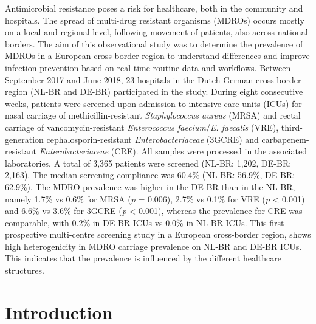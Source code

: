 \documentclass[
]{book}
\begin{document}
Antimicrobial resistance poses a risk for healthcare, both in the community and hospitals. The spread of multi-drug resistant organisms (MDROs) occurs mostly on a local and regional level, following movement of patients, also across national borders. The aim of this observational study was to determine the prevalence of MDROs in a European cross-border region to understand differences and improve infection prevention based on real-time routine data and workflows. Between September 2017 and June 2018, 23 hospitals in the Dutch-German cross-border region (NL-BR and DE-BR) participated in the study. During eight consecutive weeks, patients were screened upon admission to intensive care units (ICUs) for nasal carriage of methicillin-resistant \emph{Staphylococcus aureus} (MRSA) and rectal carriage of vancomycin-resistant \emph{Enterococcus faecium}/\emph{E. faecalis} (VRE), third-generation cephalosporin-resistant \emph{Enterobacteriaceae} (3GCRE) and carbapenem-resistant \emph{Enterobacteriaceae} (CRE). All samples were processed in the associated laboratories. A total of 3,365 patients were screened (NL-BR: 1,202, DE-BR: 2,163). The median screening compliance was 60.4\% (NL-BR: 56.9\%, DE-BR: 62.9\%). The MDRO prevalence was higher in the DE-BR than in the NL-BR, namely 1.7\% vs 0.6\% for MRSA (\emph{p} = 0.006), 2.7\% vs 0.1\% for VRE (\emph{p} \textless{} 0.001) and 6.6\% vs 3.6\% for 3GCRE (\emph{p} \textless{} 0.001), whereas the prevalence for CRE was comparable, with 0.2\% in DE-BR ICUs vs 0.0\% in NL-BR ICUs. This first prospective multi-centre screening study in a European cross-border region, shows high heterogenicity in MDRO carriage prevalence on NL-BR and DE-BR ICUs. This indicates that the prevalence is influenced by the different healthcare structures.

\hypertarget{introduction-7}{%
\section{Introduction}\label{introduction-7}}
\end{document}

